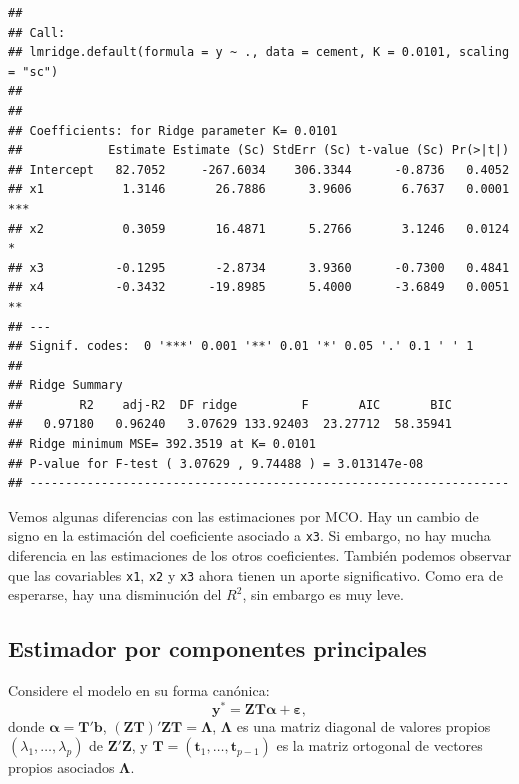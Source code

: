 \documentclass[
]{article}
\begin{document}
\begin{verbatim}
## 
## Call:
## lmridge.default(formula = y ~ ., data = cement, K = 0.0101, scaling = "sc")
## 
## 
## Coefficients: for Ridge parameter K= 0.0101 
##            Estimate Estimate (Sc) StdErr (Sc) t-value (Sc) Pr(>|t|)    
## Intercept   82.7052     -267.6034    306.3344      -0.8736   0.4052    
## x1           1.3146       26.7886      3.9606       6.7637   0.0001 ***
## x2           0.3059       16.4871      5.2766       3.1246   0.0124 *  
## x3          -0.1295       -2.8734      3.9360      -0.7300   0.4841    
## x4          -0.3432      -19.8985      5.4000      -3.6849   0.0051 ** 
## ---
## Signif. codes:  0 '***' 0.001 '**' 0.01 '*' 0.05 '.' 0.1 ' ' 1
## 
## Ridge Summary
##        R2    adj-R2  DF ridge         F       AIC       BIC 
##   0.97180   0.96240   3.07629 133.92403  23.27712  58.35941 
## Ridge minimum MSE= 392.3519 at K= 0.0101 
## P-value for F-test ( 3.07629 , 9.74488 ) = 3.013147e-08 
## -------------------------------------------------------------------
\end{verbatim}

Vemos algunas diferencias con las estimaciones por MCO. Hay un cambio de signo en la estimación del coeficiente asociado a \texttt{x3}. Si embargo, no hay mucha diferencia en las estimaciones de los otros coeficientes. También podemos observar que las covariables \texttt{x1}, \texttt{x2} y \texttt{x3} ahora tienen un aporte significativo. Como era de esperarse, hay una disminución del \(R^{2}\), sin embargo es muy leve.

\hypertarget{estimador-por-componentes-principales}{%
\subsection{Estimador por componentes principales}\label{estimador-por-componentes-principales}}

Considere el modelo en su forma canónica:
\[
\boldsymbol y^{*} = \boldsymbol Z\boldsymbol T\boldsymbol \alpha+ \boldsymbol \varepsilon,
\]
donde \(\boldsymbol \alpha= \boldsymbol T'\boldsymbol b\), \((\boldsymbol Z\boldsymbol T)'\boldsymbol Z\boldsymbol T=\boldsymbol \Lambda\), \(\boldsymbol \Lambda\) es una matriz diagonal de valores propios \((\lambda_1,\ldots,\lambda_p)\) de \(\boldsymbol Z'\boldsymbol Z\), y \(\boldsymbol T= (\boldsymbol t_{1},\ldots,\boldsymbol t_{p-1})\) es la matriz ortogonal de vectores propios asociados \(\boldsymbol \Lambda\).
\end{document}
